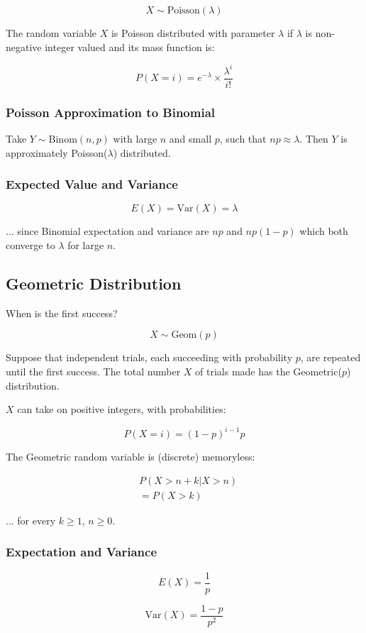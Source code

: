 $$ X \sim \text{Poisson}(\lambda) $$

The random variable $X$ is Poisson distributed with parameter $\lambda$ if $\lambda$ is non-negative integer valued and its mass function is:

$$ P(X = i) = e^{-\lambda} \times \frac{\lambda^i}{i!} $$

\subsubsection{Poisson Approximation to Binomial}

Take $Y \sim \text{Binom}(n,p)$ with large $n$ and small $p$, such that $np \approx \lambda$. Then $Y$ is  approximately Poisson($\lambda$) distributed.

\subsubsection{Expected Value and Variance}

$$ E(X) = \text{Var}(X) = \lambda $$

... since Binomial expectation and variance are $np$ and $np(1-p)$ which both converge to $\lambda$ for large $n$.

\subsection{Geometric Distribution}

When is the first success?

$$ X \sim \text{Geom}(p) $$

Suppose that independent trials, each succeeding with probability $p$, are repeated until the first success. The total number $X$ of trials made has the Geometric($p$) distribution.

$X$ can take on positive integers, with probabilities:

$$ P(X = i) = (1-p)^{i-1} p $$

The Geometric random variable is (discrete) memoryless:

\begin{align*}
     & P(X > n + k | X > n) \\
     & = P(X > k)
\end{align*}

... for every $k \geq 1$, $n \geq 0$.

\subsubsection{Expectation and Variance}

$$ E(X) = \frac{1}{p} $$

$$ \text{Var}(X) = \frac{1-p}{p^2} $$